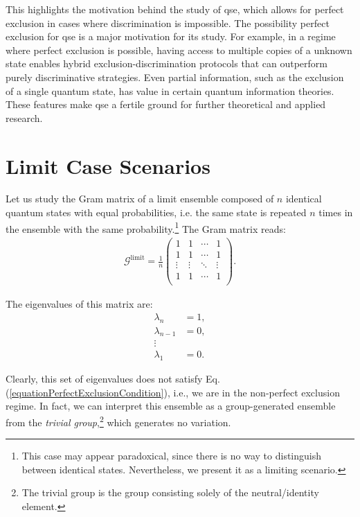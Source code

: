 \documentclass[12pt,letterpaper]{article}
\begin{document}
This highlights the motivation behind the study of \gls{qse}, which allows for perfect exclusion in cases where discrimination is impossible. The possibility perfect exclusion for \gls{qse} is a major motivation for its study. For example, in a regime where perfect exclusion is possible, having access to multiple copies of a unknown state enables hybrid exclusion-discrimination protocols that can outperform purely discriminative strategies. Even partial information, such as the exclusion of a single quantum state, has value in certain quantum information theories. These features make \gls{qse} a fertile ground for further theoretical and applied research.

\section{Limit Case Scenarios}\label{sectionLimitCaseScenarios}

Let us study the Gram matrix of a limit ensemble composed of $n$ identical quantum states with equal probabilities, i.e. the same state is repeated $n$ times in the ensemble with the same probability.\footnote{This case may appear paradoxical, since there is no way to distinguish between identical states. Nevertheless, we present it as a limiting scenario.} The Gram matrix reads:
\begin{align*}
	\mathcal{G}^{\text{limit}} = \frac{1}{n}\begin{pmatrix}
 1 & 1 & \cdots & 1 \\
 1 & 1 & \cdots & 1 \\
 \vdots & \vdots & \ddots & \vdots \\
 1 & 1 & \cdots & 1 \\
\end{pmatrix}.
\end{align*}

The eigenvalues of this matrix are:
\begin{align*}
	\lambda_n &= 1, \\
	\lambda_{n-1} &= 0, \\
	\vdots \\
	\lambda_1 &= 0.
\end{align*}

Clearly, this set of eigenvalues does not satisfy Eq. (\ref{equationPerfectExclusionCondition}), i.e., we are in the non-perfect exclusion regime. In fact, we can interpret this ensemble as a group-generated ensemble from the \emph{trivial group},\footnote{The trivial group is the group consisting solely of the neutral/identity element.} which generates no variation.
\end{document}
